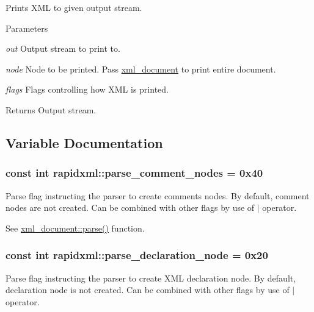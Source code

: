 \label{d7/d8a/namespacerapidxml_a13bc37d6d1047acb0efdbc1689221a5e}
Prints XML to given output stream. 
\begin{DoxyParams}{Parameters}
\item[{\em out}]Output stream to print to. \item[{\em node}]Node to be printed. Pass \hyperlink{classrapidxml_1_1xml__document}{xml\_\-document} to print entire document. \item[{\em flags}]Flags controlling how XML is printed. \end{DoxyParams}
\begin{DoxyReturn}{Returns}
Output stream. 
\end{DoxyReturn}


\subsection{Variable Documentation}
\hypertarget{namespacerapidxml_ae093dd49e2f59fa39eee95f1a6568e32}{
\subsubsection[{parse\_\-comment\_\-nodes}]{\setlength{\rightskip}{0pt plus 5cm}const int {\bf rapidxml::parse\_\-comment\_\-nodes} = 0x40}}
\label{d7/d8a/namespacerapidxml_ae093dd49e2f59fa39eee95f1a6568e32}
Parse flag instructing the parser to create comments nodes. By default, comment nodes are not created. Can be combined with other flags by use of $|$ operator. \par
\par
 See \hyperlink{classrapidxml_1_1xml__document_ad510b0c5fd8bf0180a55ffb2476e59e4}{xml\_\-document::parse()} function. \hypertarget{namespacerapidxml_a999d782659513f8015ea4236e3204c42}{
\subsubsection[{parse\_\-declaration\_\-node}]{\setlength{\rightskip}{0pt plus 5cm}const int {\bf rapidxml::parse\_\-declaration\_\-node} = 0x20}}
\label{d7/d8a/namespacerapidxml_a999d782659513f8015ea4236e3204c42}
Parse flag instructing the parser to create XML declaration node. By default, declaration node is not created. Can be combined with other flags by use of $|$ operator. \par
